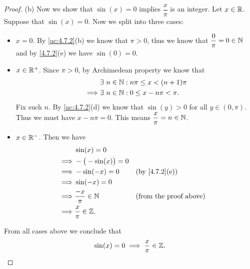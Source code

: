 \begin{proof}{(b)}
  Now we show that \(\sin(x) = 0\) implies \(\dfrac{x}{\pi}\) is an integer.
  Let \(x \in \mathbb{R}\).
  Suppose that \(\sin(x) = 0\).
  Now we split into three cases:
  \begin{itemize}
    \item \(x = 0\).
          By \cref{ac:4.7.2}(b) we know that \(\pi > 0\), thus we know that \(\dfrac{0}{\pi} = 0 \in \mathbb{N}\) and by \cref{4.7.2}(e) we have \(\sin(0) = 0\).
    \item \(x \in \mathbb{R}^+\).
          Since \(\pi > 0\), by Archimedean property we know that
          \begin{align*}
                     & \exists\ n \in \mathbb{N} : n \pi \leq x < (n + 1) \pi \\
            \implies & \exists\ n \in \mathbb{N} : 0 \leq x - n \pi < \pi.
          \end{align*}
          Fix such \(n\).
          By \cref{ac:4.7.2}(d) we know that \(\sin(y) > 0\) for all \(y \in (0, \pi)\).
          Thus we must have \(x - n \pi = 0\).
          This means \(\dfrac{x}{\pi} = n \in \mathbb{N}\).
    \item \(x \in \mathbb{R}^-\).
          Then we have
          \begin{align*}
                     & \sin(x) = 0                                                \\
            \implies & -\big(-\sin(x)\big) = 0                                    \\
            \implies & -\sin(-x) = 0           &  & \text{(by \cref{4.7.2}(e))}   \\
            \implies & \sin(-x) = 0                                               \\
            \implies & \dfrac{-x}{\pi} \in \N  &  & \text{(from the proof above)} \\
            \implies & \dfrac{x}{\pi} \in \Z.
          \end{align*}
  \end{itemize}
  From all cases above we conclude that
  \[
    \sin(x) = 0 \implies \dfrac{x}{\pi} \in \mathbb{Z}.
  \]
\end{proof}

